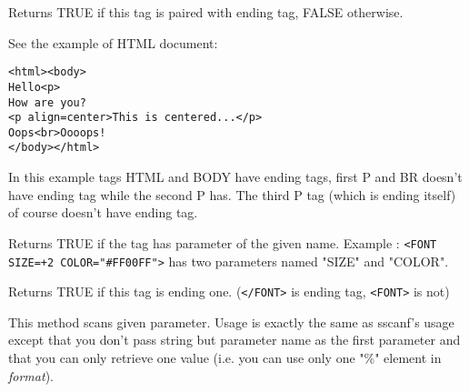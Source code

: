 Returns TRUE if this tag is paired with ending tag, FALSE otherwise.

See the example of HTML document:

\begin{verbatim}
<html><body>
Hello<p>
How are you?
<p align=center>This is centered...</p>
Oops<br>Oooops!
</body></html>
\end{verbatim}

In this example tags HTML and BODY have ending tags, first P and BR 
doesn't have ending tag while the second P has. The third P tag (which
is ending itself) of course doesn't have ending tag.

\label{wxhtmltaghasparam}


Returns TRUE if the tag has parameter of the given name. 
Example : {\tt <FONT SIZE=+2 COLOR="\#FF00FF">} has two parameters named
"SIZE" and "COLOR".



\label{wxhtmltagisending}


Returns TRUE if this tag is ending one.
({\tt </FONT>} is ending tag, {\tt <FONT>} is not)

\label{wxhtmltagscanparam}


This method scans given parameter. Usage is exactly the same as sscanf's 
usage except that you don't pass string but parameter name as the first parameter
and that you can only retrieve one value (i.e. you can use only one "\%" element
in {\it format}).






